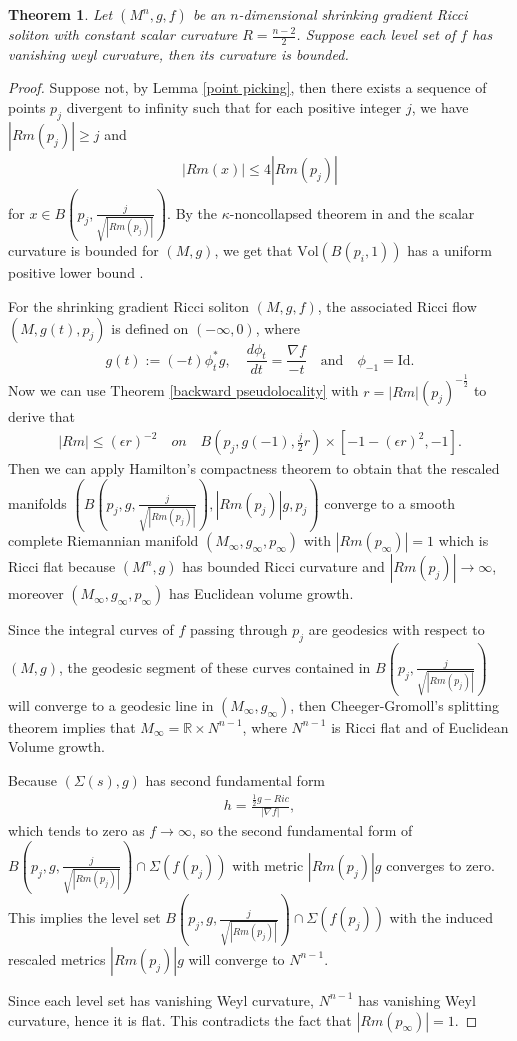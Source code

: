 \documentclass[12pt]{amsart}
\newcommand{\ban}{\begin{eqnarray*}}
\newcommand{\ean}{\end{eqnarray*}}
\newtheorem{theo}{Theorem}[section]
\begin{document}
\begin{theo}\label{bounded curvature}Let $(M^n, g, f)$ be an $n$-dimensional shrinking gradient Ricci soliton with constant scalar curvature $R=\frac{n-2}{2}$.  Suppose each level set of $f$ has vanishing weyl curvature, then its curvature is bounded.
\end{theo}

\begin{proof}
	Suppose not, by Lemma \ref{point picking}, then there exists a sequence of points $p_j$ divergent to infinity such that for each positive integer $j$, we have $|Rm(p_j)|\geq j$ and
	\ban
	|Rm(x)|\leq 4 |Rm(p_j)|
	\ean
	for $x\in B(p_j, \frac{j}{\sqrt{|Rm(p_j)|}})$.
By the $\kappa$-noncollapsed theorem in \cite{Li-Wang} and the scalar curvature is bounded for $(M, g)$, we get that $\text{Vol}(B(p_i, 1))$ has a uniform positive lower bound \cite{Li-Wang}.	

For the shrinking gradient Ricci soliton  $(M,g,f)$,
 the associated Ricci flow $(M, g(t), p_j)$ is defined on $(-\infty, 0)$, where
\[
g(t):=(-t)\phi^*_tg,\quad \frac{d\phi_t}{dt}=\frac{\nabla f}{-t}
\quad  \text{and}\quad \phi_{-1}=\mathrm{Id}.
\]
Now we can use Theorem \ref{backward pseudolocality} with $r=|Rm|(p_j)^{-\frac{1}{2}}$ to derive that
\ban
|Rm|\leq (\epsilon r)^{-2} \quad on \quad B(p_j, g(-1), \frac{j}{2}r) \times [-1-(\epsilon r)^2, -1].
\ean
	  Then we can apply Hamilton's compactness theorem to obtain that the rescaled manifolds $\left(B(p_j, g, \frac{j}{\sqrt{|Rm(p_j)|}}),  |Rm(p_j)|g, p_j\right)$ converge to a smooth complete Riemannian manifold $(M_\infty, g_\infty, p_\infty)$ with $|Rm(p_\infty)|=1$ which is Ricci flat because $(M^n, g)$ has bounded Ricci curvature and $|Rm(p_j)|\rightarrow \infty$, moreover  $(M_\infty, g_\infty, p_\infty)$ has Euclidean volume growth.
	
	\smallskip
	Since the integral curves of $f$ passing through $p_j$ are geodesics with respect to $(M, g)$, the geodesic segment of these curves contained in $B\left( p_j, \frac{j}{\sqrt{|Rm(p_j)|}}\right) $ will converge to a geodesic line in $(M_\infty, g_\infty)$, then Cheeger-Gromoll's splitting theorem \cite{Cheeger-Gromoll} implies that $M_\infty =\mathbb{R}\times N^{n-1}$, where $N^{n-1}$ is Ricci flat and of Euclidean Volume growth.
	
	\smallskip
	Because $(\Sigma(s), g)$ has second fundamental form
	\ban
	h=\frac{\frac{1}{2}g-Ric}{|\nabla f|},
	\ean
	which tends to zero as $f\rightarrow \infty$,
	so the second fundamental form of $B\left( p_j, g, \frac{j}{\sqrt{|Rm(p_j)|}}\right)   \cap \Sigma(f(p_j))$ with metric $|Rm(p_j)|g$ converges to zero. This implies the level set $B\left( p_j, g, \frac{j}{\sqrt{|Rm(p_j)|}}\right)   \cap \Sigma(f(p_j))$ with the induced rescaled metrics $|Rm(p_j)|g$ will converge to $N^{n-1}$.
	
	Since each level set has vanishing Weyl curvature,
	 $N^{n-1}$ has vanishing Weyl curvature, hence it is flat. This contradicts the fact that $|Rm(p_\infty)|=1$.
\end{proof}
\end{document}
